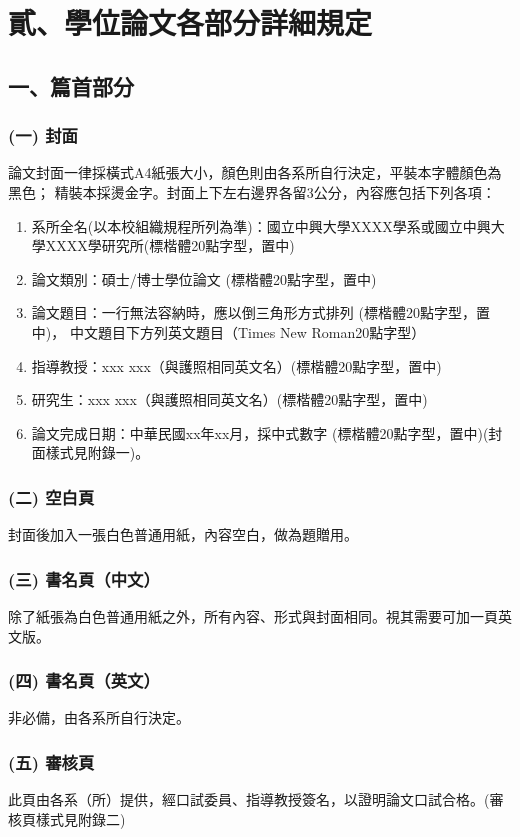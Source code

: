 \documentclass[12pt,oneside,openany,a4paper]{book}
\begin{document}
\chapter{貳、學位論文各部分詳細規定}
\section{一、篇首部分}
\subsection{(一) 封面}
論文封面一律採橫式A4紙張大小，顏色則由各系所自行決定，平裝本字體顏色為黑色；
精裝本採燙金字。封面上下左右邊界各留3公分，內容應包括下列各項：
\begin{enumerate}
    \item 系所全名(以本校組織規程所列為準)：國立中興大學XXXX學系或國立中興大學XXXX學研究所(標楷體20點字型，置中)
    \item 論文類別：碩士/博士學位論文 (標楷體20點字型，置中)
    \item 論文題目：一行無法容納時，應以倒三角形方式排列 (標楷體20點字型，置中)，
           中文題目下方列英文題目（Times New Roman20點字型）
    \item 指導教授：xxx  xxx（與護照相同英文名）(標楷體20點字型，置中)
    \item 研究生：xxx xxx（與護照相同英文名）(標楷體20點字型，置中)
    \item 論文完成日期：中華民國xx年xx月，採中式數字 (標楷體20點字型，置中)(封面樣式見附錄一)。
\end{enumerate}

\subsection{(二) 空白頁}
封面後加入一張白色普通用紙，內容空白，做為題贈用。

\subsection{(三) 書名頁（中文）}
除了紙張為白色普通用紙之外，所有內容、形式與封面相同。視其需要可加一頁英文版。

\subsection{(四) 書名頁（英文）}
非必備，由各系所自行決定。

\subsection{(五) 審核頁}
此頁由各系（所）提供，經口試委員、指導教授簽名，以證明論文口試合格。(審核頁樣式見附錄二)
\end{document}

